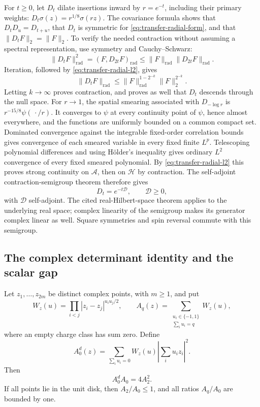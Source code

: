 For $t\geq0$, let $D_t$ dilate insertions inward by $r=e^{-t}$, including
their primary weights:
$D_t\sigma(z)=r^{1/8}\sigma(rz)$.
The covariance formula shows that $D_tD_u=D_{t+u}$, that $D_t$ is
symmetric for \eqref{eq:transfer-radial-form}, and that
$\|D_tF\|_2=\|F\|_2$.  To verify the needed contraction without
assuming a spectral representation, use symmetry and Cauchy--Schwarz:
\[
 \|D_tF\|_{\mathrm{rad}}^2
 =(F,D_{2t}F)_{\mathrm{rad}}
 \leq\|F\|_{\mathrm{rad}}\|D_{2t}F\|_{\mathrm{rad}}.
\]
Iteration, followed by \eqref{eq:transfer-radial-l2}, gives
\[
 \|D_tF\|_{\mathrm{rad}}
 \leq\|F\|_{\mathrm{rad}}^{1-2^{-k}}
       \|F\|_2^{2^{-k}}.
\]
Letting $k\to\infty$ proves contraction, and proves as well that
$D_t$ descends through the null space.  For $r\to1$, the spatial
smearing associated with $D_{-\log r}$ is
$r^{-15/8}\psi(\,\cdot/r)$.  It converges to $\psi$ at every
continuity point of $\psi$, hence almost everywhere, and the functions
are uniformly bounded on a common compact set.  Dominated convergence
against the integrable fixed-order correlation bounds gives convergence
of each smeared variable in every fixed finite $L^p$.  Telescoping
polynomial differences and using H\"older's inequality gives ordinary
$L^2$ convergence of every fixed smeared polynomial.  By
\eqref{eq:transfer-radial-l2} this proves strong continuity on
$\mathcal A$, then on $\mathcal H$ by contraction. The self-adjoint
contraction-semigroup theorem
\cite[Theorem~7.3.10, pp.~337--338]{BuehlerSalamon2016} therefore gives
\begin{equation}
 D_t=e^{-t\mathcal D},\qquad \mathcal D\geq0,
 \label{eq:transfer-radial-generator}
\end{equation}
with $\mathcal D$ self-adjoint. The cited real-Hilbert-space theorem
applies to the underlying real space; complex linearity of the semigroup
makes its generator complex linear as well. Square symmetries and spin reversal
commute with this semigroup.

\subsection{The complex determinant identity and the scalar gap}

\begin{lemma}
\label{lem:transfer-charges}
Let $z_1,\ldots,z_{2m}$ be distinct complex points, with $m\geq1$, and
put
\[
 W_z(u)=\prod_{i<j}|z_i-z_j|^{u_i u_j/2},\qquad
 A_q(z)=\sum_{\substack{u_i\in\{-1,1\}\\\sum_i u_i=q}}W_z(u),
\]
where an empty charge class has sum zero.  Define
\[
 A_0^d(z)=\sum_{\sum_i u_i=0}W_z(u)
                        \left|\sum_i u_i z_i\right|^2.
\]
Then
\begin{equation}
 A_0^dA_0=4A_2^2.
 \label{eq:transfer-charge-identity}
\end{equation}
If all points lie in the unit disk, then $A_2/A_0\leq1$, and all
ratios $A_q/A_0$ are bounded by one.
\end{lemma}

